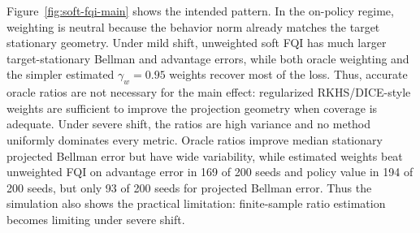 Figure~\ref{fig:soft-fqi-main} shows the intended pattern. In the on-policy
regime, weighting is neutral because the behavior norm already matches the
target stationary geometry. Under mild shift, unweighted soft FQI has much
larger target-stationary Bellman and advantage errors, while both oracle
weighting and the simpler estimated $\gamma_w=0.95$ weights recover most of the
loss. Thus, accurate oracle ratios are not necessary for the main effect:
regularized RKHS/DICE-style weights are sufficient to improve the projection
geometry when coverage is adequate. Under severe shift, the ratios are high
variance and no method uniformly dominates every metric. Oracle ratios improve
median stationary projected Bellman error but have wide variability, while
estimated weights beat unweighted FQI on advantage error in 169 of 200 seeds
and policy value in 194 of 200 seeds, but only 93 of 200 seeds for projected
Bellman error. Thus the simulation also shows the practical limitation:
finite-sample ratio estimation becomes limiting under severe shift.
